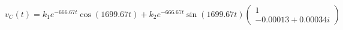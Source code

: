 \documentclass[preview]{standalone}
\begin{document}
\begin{center}
$v_C(t) = k_1e^{-666.67t} \cos(1699.67t) + k_2e^{-666.67t} \sin(1699.67t) \begin{pmatrix} 1 \\ -0.00013 + 0.00034i \end{pmatrix}$
\end{center}
\end{document}
